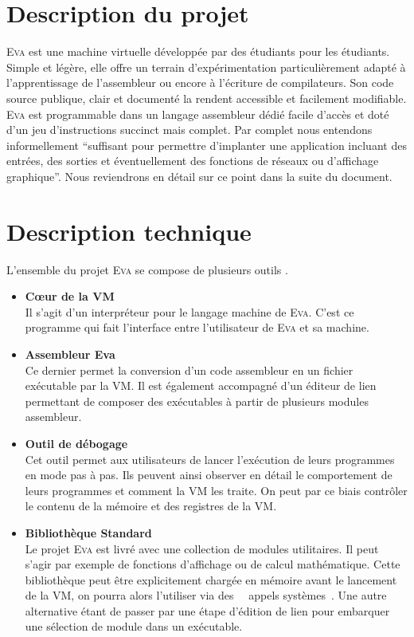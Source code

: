 \documentclass[11pt]{article}
\makeatletter
\providecommand{\og}{\leavevmode\flqq~}%
\providecommand{\fg}{\ifdim\lastskip>\z@\unskip\fi~\frqq}%
\newcommand{\noun}[1]{\textsc{#1}}
\makeatother
\begin{document}
\vfill
\hspace{0pt}
\newpage{}

\section{Description du projet}

\noun{Eva} est une machine virtuelle développée par des étudiants pour les
étudiants. Simple et légère, elle offre un terrain d'expérimentation
particulièrement adapté à l'apprentissage de l'assembleur ou encore
à l'écriture de compilateurs. Son code source publique, clair et documenté
la rendent accessible et facilement modifiable. \noun{Eva} est programmable
dans un langage assembleur dédié facile d'accès et doté d'un jeu d'instructions
succinct mais complet. Par complet nous entendons informellement ``suffisant pour permettre d'implanter une application incluant des entrées, des sorties et éventuellement des fonctions de réseaux ou d'affichage graphique''. Nous reviendrons en détail sur ce point dans la suite du document.

\section{Description technique}

L'ensemble du projet \noun{Eva} se compose de plusieurs outils .

\begin{itemize}
  \item \textbf{Cœur de la VM} \\
        Il s'agit d'un interpréteur pour le langage machine de \noun{Eva}. C'est ce programme qui fait l'interface entre l'utilisateur de \noun{Eva} et sa machine.

  \item \textbf{Assembleur Eva} \\
        Ce dernier permet la conversion d'un code assembleur en un fichier exécutable par la VM. Il est également accompagné d'un éditeur de lien permettant de composer des exécutables à partir de plusieurs modules assembleur.

  \item \textbf{Outil de débogage} \\
        Cet outil permet aux utilisateurs de lancer l’exécution de leurs programmes en mode pas à pas. Ils peuvent ainsi observer en détail le comportement de leurs programmes et comment la VM les traite. On peut par ce biais contrôler le contenu de la mémoire et des registres de la VM.


  \item \textbf{Bibliothèque Standard} \\
        Le projet \noun{Eva} est livré avec une collection de modules utilitaires. Il peut s'agir par exemple de fonctions d'affichage ou de calcul mathématique. Cette bibliothèque peut être explicitement chargée en mémoire avant le lancement de la VM, on pourra alors l'utiliser via des \og~appels systèmes\fg. Une autre alternative étant de passer par une étape d'édition de lien pour embarquer une sélection de module dans un exécutable.

\end{itemize}
\end{document}
